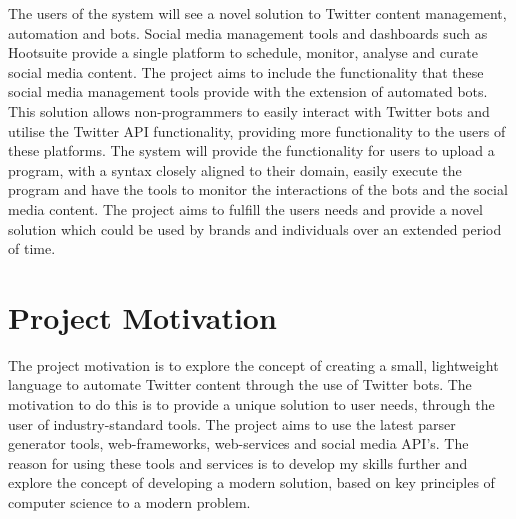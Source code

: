 The users of the system will see a novel solution to Twitter content management, automation and bots. Social media management tools and dashboards such as Hootsuite provide a single platform to schedule, monitor, analyse and curate social media content. The project aims to include the functionality that these social media management tools provide with the extension of automated bots. This solution allows non-programmers to easily interact with Twitter bots and utilise the Twitter API functionality, providing more functionality to the users of these platforms. The system will provide the functionality for users to upload a program, with a syntax closely aligned to their domain, easily execute the program and have the tools to monitor the interactions of the bots and the social media content. The project aims to fulfill the users needs and provide a novel solution which could be used by brands and individuals over an extended period of time.

\section{Project Motivation}

The project motivation is to explore the concept of creating a small, lightweight language to automate Twitter content through the use of Twitter bots. The motivation to do this is to provide a unique solution to user needs, through the user of industry-standard tools. The project aims to use the latest parser generator tools, web-frameworks, web-services and social media API's. The reason for using these tools and services is to develop my skills further and explore the concept of developing a modern solution, based on key principles of computer science to a modern problem.

